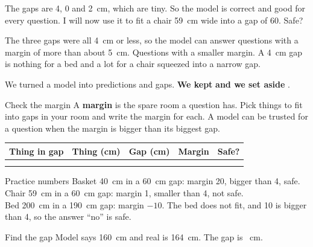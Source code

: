 \begin{multix}[hmm]\multixbot[hmm]\tcblower
The gaps are 4, 0 and 2~cm, which are tiny. So the model is correct and good for every question. I will now use it to fit a chair 59~cm wide into a gap of 60. Safe?
\end{multix}

{The three gaps were all 4~cm or less, so the model can answer questions with a margin of more than about 5~cm.}
{Questions with a smaller margin. A 4~cm gap is nothing for a bed and a lot for a chair squeezed into a narrow gap.}

\begin{keepbox}
We turned a model into predictions and gaps. \textbf{We kept} \wline[3.4cm] \textbf{and we set aside} \wline[3.4cm].
\end{keepbox}

\begin{tryit}{Check the margin}
A \textbf{margin} is the spare room a question has. Pick things to fit into gaps in your room and write the margin for each. A model can be trusted for a question when the margin is bigger than its biggest gap.\par\medskip
\renewcommand{\arraystretch}{1.6}
\begin{tabular}{|p{3.1cm}|c|c|c|c|}
\hline
\textbf{Thing in gap} & \textbf{Thing (cm)} & \textbf{Gap (cm)} & \textbf{Margin} & \textbf{Safe?}\\ \hline
 & & & & \\ \hline
 & & & & \\ \hline
\end{tabular}
\end{tryit}

\begin{worked}{Practice numbers}
Basket 40~cm in a 60~cm gap: margin 20, bigger than 4, safe.\\
Chair 59~cm in a 60~cm gap: margin 1, smaller than 4, not safe.\\
Bed 200~cm in a 190~cm gap: margin $-10$. The bed does not fit, and 10 is bigger than 4, so the answer ``no'' is safe.
\end{worked}

\clearpage

\begin{puzzle}{Find the gap}
Model says 160~cm and real is 164~cm. The gap is \wline[1.6cm]~cm.
\end{puzzle}

